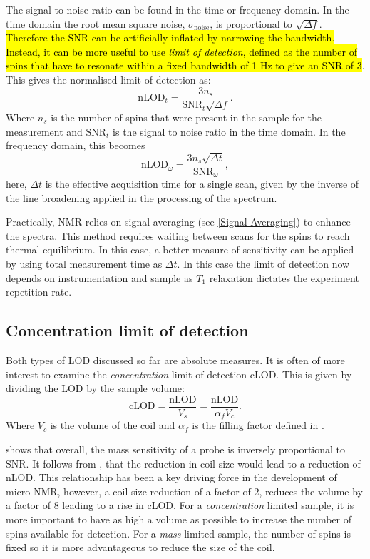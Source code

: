 The signal to noise ratio can be found in the time or frequency domain. In the time domain the root mean square noise, $\sigma_\text{noise}$,
is proportional to $\sqrt{\Delta{f}}$. \hl{Therefore the SNR can be
artificially inflated by narrowing the bandwidth. Instead, it can be more useful to use \textit{limit of detection}, defined as
the number of spins that have to resonate within a fixed bandwidth of 1 Hz to give an SNR of 3}. This gives
the normalised limit of detection as\citep{Badilita:2011td}:
\begin{equation}
  \text{nLOD}_{t} = \frac{3n_s}{\text{SNR}_{t}\sqrt{\Delta{f}}}.
\end{equation}
Where $n_s$ is the number of spins that were present in the sample for the measurement and $\text{SNR}_t$ is the
signal to noise ratio in the time domain.
In the frequency domain, this becomes
\begin{equation}\label{eqn:nLOD}
  \text{nLOD}_\omega = \frac{3n_s\sqrt{\Delta{t}}}{\text{SNR}_\omega},
\end{equation}
here, $\Delta{t}$ is the effective acquisition time for a single scan, given by the inverse of the
line broadening applied in the processing of the spectrum.

Practically, NMR relies on signal averaging (see \ref{Signal Averaging}) to enhance the spectra. This
method requires waiting between scans for the spins to reach thermal equilibrium. In
this case, a better measure of sensitivity can be applied by using total measurement time
as $\Delta{t}$. In this case the limit of detection now depends on instrumentation
and sample as $T_1$ relaxation dictates the experiment repetition rate.

\subsection{Concentration limit of detection}

Both types of LOD discussed so far are absolute measures. It is often of more
interest to examine the \textit{concentration} limit of detection cLOD. This is given by
dividing the LOD by the sample volume:
\begin{equation}\label{eqn:cLOD}
  \text{cLOD} = \frac{\text{nLOD}}{V_s} =\frac{\text{nLOD}}{\alpha_fV_c}.
\end{equation}
Where $V_c$ is the volume of the coil and $\alpha_f$ is the filling factor defined in .

 shows that overall, the mass sensitivity of a probe is inversely proportional
to SNR. It follows from , that the reduction in coil size would lead to a reduction of
nLOD. This relationship has been a key driving force in the development of micro-NMR, however,
a coil size reduction of a factor of 2, reduces the volume by a factor of 8 leading to a
rise in cLOD. For a \textit{concentration} limited sample, it is more important to have
as high a volume as possible to increase the number of spins available for detection. For a \textit{mass} limited
sample, the number of spins is fixed so it is more advantageous to reduce the size of the coil.


